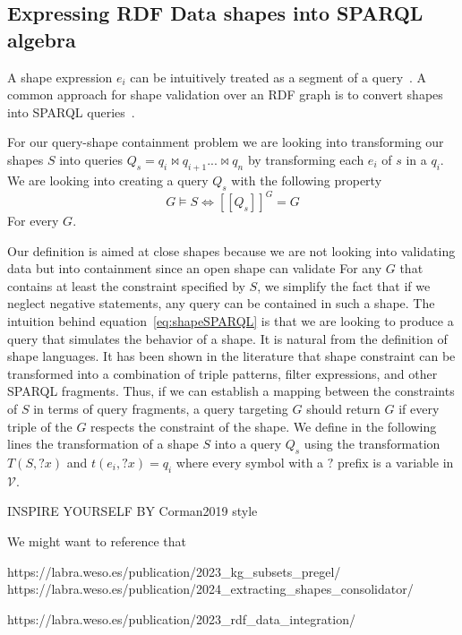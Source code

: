 \subsection{Expressing RDF Data shapes into SPARQL algebra}\label{sec:shape2SPARQL}

A shape expression $e_i$ can be intuitively treated as a segment of a query~\cite{delva2023}.
A common approach for shape validation over an RDF graph is to convert shapes into SPARQL queries~\cite{labragayo2017validatingdescribinglinkeddata, Corman2019,Prestamo2023, spapeExpressionConvert}.~

For our query-shape containment problem we are looking into transforming our shapes $S$ into queries $Q_s =  q_i \bowtie q_{i+1} ... \bowtie q_n$ by transforming each $e_i$ of $s$ in a $q_i$.
We are looking into creating a query $Q_s$ with the following property
\begin{equation}\label{eq:shapeSPARQL}
   G \models S \iff [\![ Q_s ]\!]^{G} =  G
\end{equation}
For every $G$.

Our definition is aimed at close shapes because we are not looking into validating data but into containment since an open shape can validate 
For any $G$ that contains at least the constraint specified by $S$, we simplify the fact that if we neglect negative statements, any query can be contained in such a shape.
The intuition behind equation~\ref{eq:shapeSPARQL} is that we are looking to produce a query that simulates the behavior of a shape.
It is natural from the definition of shape languages. It has been shown in the literature that shape constraint can be transformed into a combination of triple patterns, filter expressions, and other SPARQL fragments.
Thus, if we can establish a mapping between the constraints of $S$ in terms of query fragments, a query targeting $G$ should return $G$ if every triple of the 
$G$ respects the constraint of the shape.
We define in the following lines the transformation of a shape $S$ into a query $Q_s$ using the transformation $T(S,?x)$ and $t(e_i, ?x) = q_i$ where every 
symbol with a $?$ prefix is a variable in $\mathcal{V}$.


\iffalse
INSPIRE YOURSELF BY Corman2019 style

We might want to reference that

https://labra.weso.es/publication/2023_kg_subsets_pregel/
https://labra.weso.es/publication/2024_extracting_shapes_consolidator/

https://labra.weso.es/publication/2023_rdf_data_integration/

